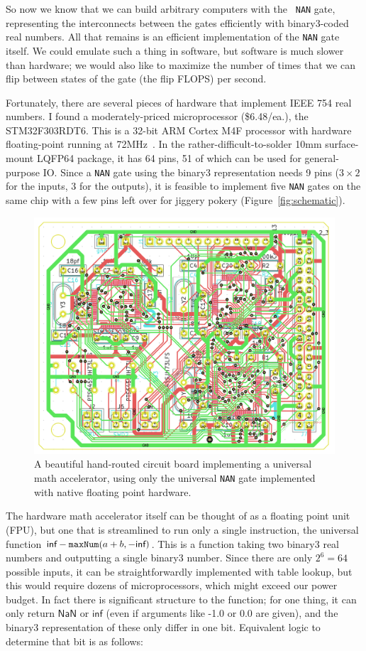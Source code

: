 \documentclass[twocolumn,cm]{article}
\newcommand\nan{\textsf{NaN}}
\renewcommand\inf{\textsf{inf}}
\begin{document}
So now we know that we can build arbitrary computers with the {\tt
  NAN} gate, representing the interconnects between the gates efficiently
with binary3-coded real numbers. All that remains is an efficient
implementation of the {\tt NAN} gate itself. We could emulate such
a thing in software, but software is much slower than hardware;
we would also like to maximize the number of times that we can flip
between states of the gate (the flip FLOPS) per second.

Fortunately, there are several pieces of hardware that implement
IEEE 754 real numbers. I found a moderately-priced microprocessor
(\$6.48/ea.), the STM32F303RDT6. This is a 32-bit ARM Cortex M4F
processor with hardware floating-point running at 72MHz~\cite{stm32}.
In the rather-difficult-to-solder 10mm surface-mount LQFP64 package,
it has 64 pins, 51 of which can be used for general-purpose IO.
Since a {\tt NAN} gate using the binary3 representation needs 9
pins ($3 \times 2$ for the inputs, $3$ for the outputs), it is
feasible to implement five {\tt NAN} gates on the same chip with
a few pins left over for jiggery pokery (Figure~\ref{fig:schematic}).

\begin{figure}[t!]
  \begin{center}
    \includegraphics[width=0.55 \linewidth]{board}
  \end{center}\vspace{-0.1in}
  \caption{A beautiful hand-routed circuit board implementing a
    universal math accelerator, using only the universal {\tt NAN} gate
    implemented with native floating point hardware.}
  \label{fig:board}
\end{figure}

The hardware math accelerator itself can be thought of as a floating
point unit (FPU), but one that is streamlined to run only a single
instruction, the universal function $\inf - {\tt maxNum}(a + b, -\inf)$.
This is a function taking two binary3 real numbers and
outputting a single binary3 number. Since there are only $2^6 = 64$
possible inputs, it can be straightforwardly implemented with table
lookup, but this would require dozens of microprocessors, which
might exceed our power budget. In fact there is significant structure
to the function; for one thing, it can only return $\nan$ or $\inf$ (even
if arguments like -1.0 or 0.0 are given), and the
binary3 representation of these only differ in one bit. Equivalent
logic to determine that bit is as follows:
\end{document}
